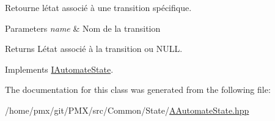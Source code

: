 Retourne l\textquotesingle{}état associé à une transition spécifique. 


\begin{DoxyParams}{Parameters}
{\em name} & Nom de la transition \\
\hline
\end{DoxyParams}
\begin{DoxyReturn}{Returns}
L\textquotesingle{}état associé à la transition ou {\ttfamily N\+U\+LL}. 
\end{DoxyReturn}


Implements \hyperlink{classIAutomateState_a228fe704fd235a83cae36e5dd197c473}{I\+Automate\+State}.



The documentation for this class was generated from the following file\+:\begin{DoxyCompactItemize}
\item 
/home/pmx/git/\+P\+M\+X/src/\+Common/\+State/\hyperlink{AAutomateState_8hpp}{A\+Automate\+State.\+hpp}\end{DoxyCompactItemize}

